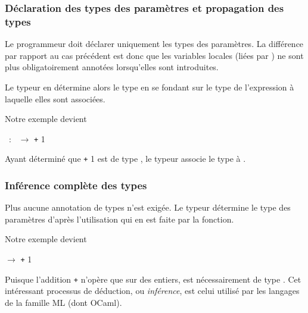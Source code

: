 %
\begin{frame}
\frametitle{Déclaration des types des paramètres et propagation des types}

Le programmeur doit déclarer uniquement les types des paramètres. La
différence par rapport au cas précédent est donc que les variables
locales (liées par \Xlet) ne sont plus obligatoirement annotées
lorsqu'elles sont introduites.

\bigskip

Le typeur en détermine alors le type en se fondant sur le type de
l'expression à laquelle elles sont associées.

\bigskip

\exemple \quad Notre exemple devient

\centerline{\small \Xfun \lpar{}~:~\rpar{} $\rightarrow$
\Xlet {} \equal {} \texttt{+} \num{1} \Xin {}}

\bigskip

Ayant déterminé que  \texttt{+} \num{1} est de type ,
le typeur associe le type  à .

\end{frame}

%
\begin{frame}
\frametitle{Inférence complète des types}

Plus aucune annotation de types n'est exigée. Le typeur détermine le
type des paramètres d'après l'utilisation qui en est faite par la
fonction.

\bigskip

\exemple \quad Notre exemple devient

\centerline{\small \Xfun {} $\rightarrow$ \Xlet {} \equal
{} \texttt{+} \num{1} \Xin {}}

\bigskip

Puisque l'addition \texttt{+} n'opère que sur des entiers,  est
nécessairement de type . Cet intéressant processus de
déduction, ou \emph{inférence}, est celui utilisé par les langages de
la famille ML (dont OCaml).

\end{frame}

